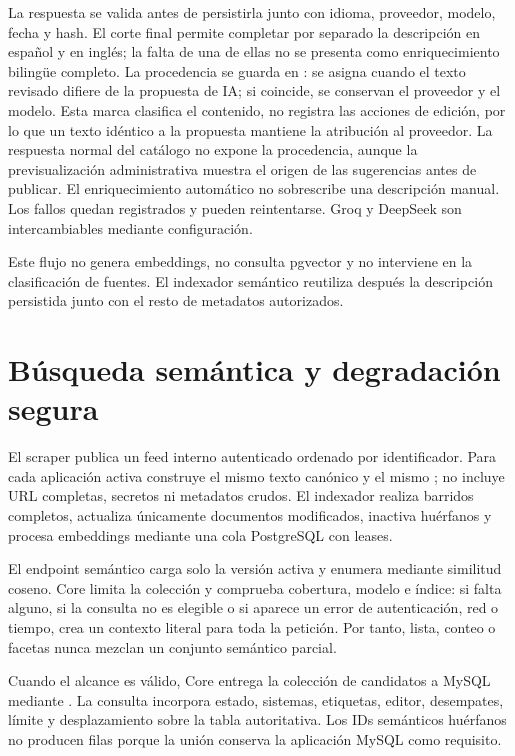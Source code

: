La respuesta se valida antes de persistirla junto con idioma, proveedor, modelo, fecha y hash. El corte final permite completar por separado la descripción en español y en inglés; la falta de una de ellas no se presenta como enriquecimiento bilingüe completo. La procedencia se guarda en : se asigna  cuando el texto revisado difiere de la propuesta de IA; si coincide, se conservan el proveedor y el modelo. Esta marca clasifica el contenido, no registra las acciones de edición, por lo que un texto idéntico a la propuesta mantiene la atribución al proveedor. La respuesta normal del catálogo no expone la procedencia, aunque la previsualización administrativa muestra el origen de las sugerencias antes de publicar. El enriquecimiento automático no sobrescribe una descripción manual. Los fallos quedan registrados y pueden reintentarse. Groq y DeepSeek son intercambiables mediante configuración.

Este flujo no genera embeddings, no consulta pgvector y no interviene en la clasificación de fuentes. El indexador semántico reutiliza después la descripción persistida junto con el resto de metadatos autorizados.

\section{Búsqueda semántica y degradación segura}

El scraper publica un feed interno autenticado ordenado por identificador. Para cada aplicación activa construye el mismo texto canónico y el mismo ; no incluye URL completas, secretos ni metadatos crudos. El indexador realiza barridos completos, actualiza únicamente documentos modificados, inactiva huérfanos y procesa embeddings mediante una cola PostgreSQL con leases.

El endpoint semántico carga solo la versión activa y enumera mediante similitud coseno. Core limita la colección y comprueba cobertura, modelo e índice: si falta alguno, si la consulta no es elegible o si aparece un error de autenticación, red o tiempo, crea un contexto literal para toda la petición. Por tanto, lista, conteo o facetas nunca mezclan un conjunto semántico parcial.

Cuando el alcance es válido, Core entrega la colección de candidatos a MySQL mediante . La consulta incorpora estado, sistemas, etiquetas, editor, desempates, límite y desplazamiento sobre la tabla autoritativa. Los IDs semánticos huérfanos no producen filas porque la unión conserva la aplicación MySQL como requisito.

